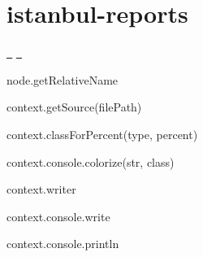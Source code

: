 \chapter{istanbul-\/reports}
\hypertarget{md_pkiclassroomrescheduler_2src_2main_2frontend_2node__modules_2istanbul-reports_2_r_e_a_d_m_e}{}\label{md_pkiclassroomrescheduler_2src_2main_2frontend_2node__modules_2istanbul-reports_2_r_e_a_d_m_e}
\label{md_pkiclassroomrescheduler_2src_2main_2frontend_2node__modules_2istanbul-reports_2_r_e_a_d_m_e_autotoc_md15258}%
%
 \href{https://greenkeeper.io/}{\texttt{ }} \href{https://travis-ci.org/istanbuljs/istanbul-reports}{\texttt{ }}


\begin{DoxyItemize}
\item node.\+get\+Relative\+Name
\item context.\+get\+Source(file\+Path)
\item context.\+class\+For\+Percent(type, percent)
\item context.\+console.\+colorize(str, class)
\item context.\+writer
\item context.\+console.\+write
\item context.\+console.\+println 
\end{DoxyItemize}